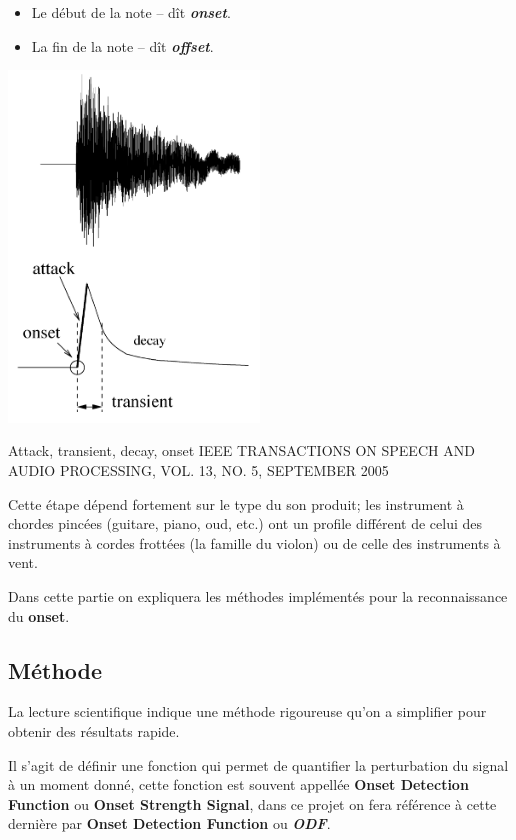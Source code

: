 \documentclass[]{article}
\providecommand{\tightlist}{%
  \setlength{\itemsep}{0pt}\setlength{\parskip}{0pt}}
\begin{document}
\begin{itemize}
\tightlist
\item
  Le début de la note -- dît \textbf{\emph{onset}}.
\item
  La fin de la note -- dît \textbf{\emph{offset}}.
\end{itemize}

\includegraphics[width=0.5\textwidth,height=\textheight]{img/onset.png}

Attack, transient, decay, onset IEEE TRANSACTIONS ON SPEECH AND AUDIO
PROCESSING, VOL. 13, NO. 5, SEPTEMBER 2005

Cette étape dépend fortement sur le type du son produit; les instrument
à chordes pincées (guitare, piano, oud, etc.) ont un profile différent
de celui des instruments à cordes frottées (la famille du violon) ou de
celle des instruments à vent.

Dans cette partie on expliquera les méthodes implémentés pour la
reconnaissance du \textbf{onset}.

\hypertarget{methode}{%
\subsection{Méthode}\label{methode}}

La lecture scientifique indique une méthode rigoureuse qu'on a
simplifier pour obtenir des résultats rapide.

Il s'agit de définir une fonction qui permet de quantifier la
perturbation du signal à un moment donné, cette fonction est souvent
appellée \textbf{Onset Detection Function} ou \textbf{Onset Strength
Signal}, dans ce projet on fera référence à cette dernière par
\textbf{Onset Detection Function} ou \textbf{\emph{ODF}}.
\end{document}
